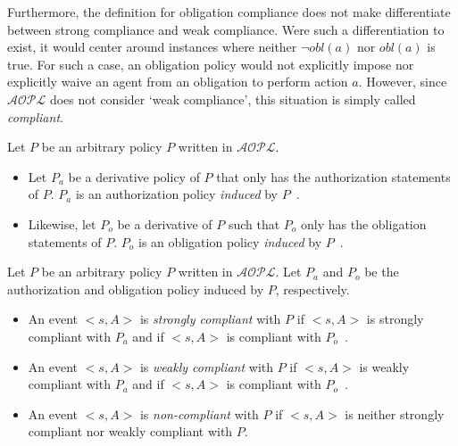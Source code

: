 Furthermore, the definition for obligation compliance does not make differentiate between strong compliance and weak compliance.
Were such a differentiation to exist, it would center around instances where neither $\neg obl(a)$ nor $obl(a)$ is true\footnotemark.
For such a case, an obligation policy would not explicitly impose nor explicitly waive an agent from an obligation to perform action $a$.
However, since $\mathcal{AOPL}$ does not consider `weak compliance', this situation is simply called \textit{compliant}.


\begin{definition}
    Let $P$ be an arbitrary policy $P$ written in $\mathcal{AOPL}$.

    \begin{itemize}
        \item Let $P_a$ be a derivative policy of $P$ that only has the authorization statements of $P$.
            $P_a$ is an authorization policy \textit{induced} by $P$~\citep{gelfond_authorization_2008}.
        \item Likewise, let $P_o$ be a derivative of $P$ such that $P_o$ only has the obligation statements of $P$.
            $P_o$ is an obligation policy \textit{induced} by $P$~\citep{gelfond_authorization_2008}.
    \end{itemize}
\end{definition}

\begin{definition}
    Let $P$ be an arbitrary policy $P$ written in $\mathcal{AOPL}$.
    Let $P_a$ and $P_o$ be the authorization and obligation policy induced by $P$, respectively.

    \begin{itemize}
        \item An event $<s, A>$ is \textit{strongly compliant} with $P$ if $<s, A>$ is strongly compliant with $P_a$ and if $<s, A>$ is compliant with $P_o$~\citep{gelfond_authorization_2008}.
        \item An event $<s, A>$ is \textit{weakly compliant} with $P$ if $<s, A>$ is weakly compliant with $P_a$ and if $<s, A>$ is compliant with $P_o$~\citep{gelfond_authorization_2008}.
        \item An event $<s, A>$ is \textit{non-compliant} with $P$ if $<s, A>$ is neither strongly compliant nor weakly compliant with $P$\footnotemark.
    \end{itemize}
\end{definition}


